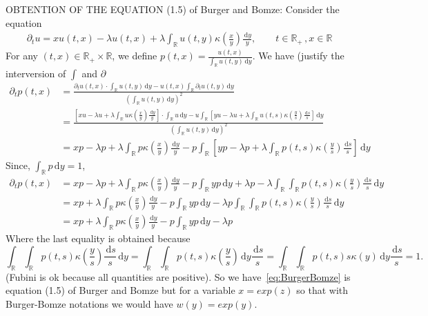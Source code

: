 \documentclass{article}
\newcommand{\p}{\partial}
\newcommand{\diff}{\,\mathrm{d}}
\newcommand{\RR}{\mathbb{R}}
\begin{document}
OBTENTION OF THE EQUATION (1.5) of Burger and Bomze: Consider the equation
\begin{align*}
    \p_t u = xu(t,x) - \lambda u(t,x)+ \lambda \int_\RR u(t,y)\kappa\left(\frac{x}{y}\right) \frac{\diff y}{y}, \qquad t \in \RR_+ \,, x \in \RR
\end{align*}
For any $(t, x) \in \RR_+ \times \RR$, we define $p(t,x) = \frac{u(t,x)}{\int_\RR u(t,y)\diff y}$. 
We have (justify the interversion of $\int$ and $\p$
\begin{align*}
    \p_t p(t, x) 
    &= \frac{\p_tu(t,x) \cdot \int_\RR u(t,y)\diff y - u(t,x) \int_\RR \p_t u(t,y)\diff y}{\left( \int_\RR u(t,y)\diff y \right)^2} \\
    &= \frac{\left[ xu - \lambda u + \lambda \int_\RR u\kappa\left(\frac{x}{y}\right) \frac{\diff y}{y}\right] \cdot \int_\RR u\diff y - u\int_\RR \left[ yu - \lambda u + \lambda \int_\RR u(t,s)\kappa\left(\frac{y}{s}\right) \frac{\diff s}{s}\right]\diff y}{\left( \int_\RR u(t,y)\diff y \right)^2} \\
    &= xp - \lambda p + \lambda \int_\RR p\kappa\left(\frac{x}{y}\right) \frac{\diff y}{y}
    -  p\int_\RR \left[ yp - \lambda p + \lambda \int_\RR p(t,s)\kappa\left(\frac{y}{s}\right) \frac{\diff s}{s}\right]\diff y
\end{align*}
Since, $\int_\RR p \diff y = 1$, 
\begin{equation}\label{eq:BurgerBomze}\begin{array}{ll}
    \p_t p(t, x) 
    &= xp - \lambda p + \lambda \int_\RR p\kappa\left(\frac{x}{y}\right) \frac{\diff y}{y}
    -  p\int_\RR yp \diff y + \lambda p - \lambda \int_\RR \int_\RR p(t,s)\kappa\left(\frac{y}{s}\right) \frac{\diff s}{s}\diff y\\
    &= xp 
    + \lambda \int_\RR p\kappa\left(\frac{x}{y}\right) \frac{\diff y}{y}
    - p\int_\RR yp \diff y 
    - \lambda p \int_\RR \int_\RR p(t,s)\kappa\left(\frac{y}{s}\right) \frac{\diff s}{s}\diff y\\
    &= xp 
    + \lambda \int_\RR p\kappa\left(\frac{x}{y}\right) \frac{\diff y}{y}
    - p\int_\RR yp \diff y 
    - \lambda p\end{array}
\end{equation}
Where the last equality is obtained because 
$$\int_\RR \int_\RR p(t,s)\kappa\left(\frac{y}{s}\right) \frac{\diff s}{s}\diff y = \int_\RR \int_\RR p(t,s)\kappa\left(\frac{y}{s}\right) \diff y \frac{\diff s}{s} = \int_\RR \int_\RR p(t,s)s\kappa\left(y\right) \diff y \frac{\diff s}{s} = 1.$$
(Fubini is ok because all quantities are positive). So we have~\eqref{eq:BurgerBomze}
is equation (1.5) of Burger and Bomze but for a variable $x=exp(z)$ so that with Burger-Bomze notations we would have $w(y)=exp(y)$.
\end{document}
